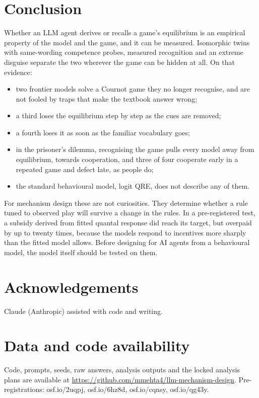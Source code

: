 \documentclass[11pt]{article}
\theoremstyle{definition}
\theoremstyle{remark}
\begin{document}
\section{Conclusion}

Whether an LLM agent derives or recalls a game's equilibrium is an empirical property of the
model and the game, and it can be measured. Isomorphic twins with same-wording competence
probes, measured recognition and an extreme disguise separate the two wherever the game can be
hidden at all. On that evidence:
\begin{itemize}
\item two frontier models solve a Cournot game they no longer recognise, and are not fooled by
  traps that make the textbook answer wrong;
\item a third loses the equilibrium step by step as the cues are removed;
\item a fourth loses it as soon as the familiar vocabulary goes;
\item in the prisoner's dilemma, recognising the game pulls every model away from equilibrium,
  towards cooperation, and three of four cooperate early in a repeated game and defect late, as
  people do;
\item the standard behavioural model, logit QRE, does not describe any of them.
\end{itemize}
For mechanism design these are not curiosities. They determine whether a rule tuned to observed
play will survive a change in the rules. In a pre-registered test, a subsidy derived from fitted
quantal response did reach its target, but overpaid by up to twenty times, because the models
respond to incentives more sharply than the fitted model allows. Before designing for AI agents
from a behavioural model, the model itself should be tested on them.

\section*{Acknowledgements}
Claude (Anthropic) assisted with code and writing.

\section*{Data and code availability}
Code, prompts, seeds, raw answers, analysis outputs and the locked analysis plans are available at
\url{https://github.com/mmehta4/llm-mechanism-design}. Pre-registrations: osf.io/2uqpj, osf.io/6hz8d, osf.io/cqnsy, osf.io/qg43y.
\end{document}
